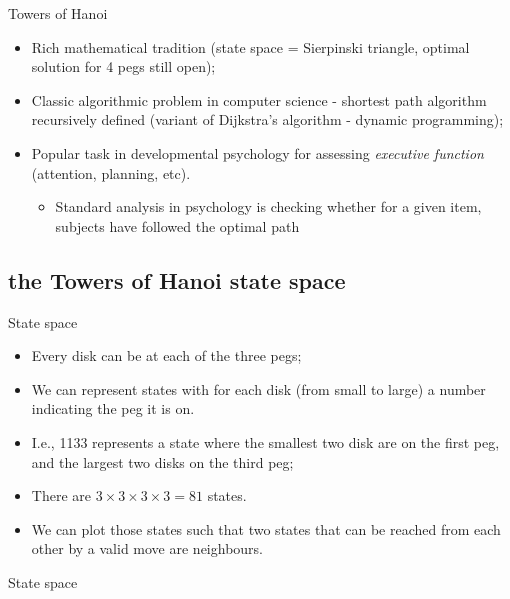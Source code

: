 \documentclass[xcolor=table]{beamer}
\begin{document}
\begin{frame}{Towers of Hanoi}
  \begin{itemize}
  \item Rich mathematical tradition (state space = \alert{Sierpinski triangle}, optimal solution for 4 pegs still open);
  \item Classic algorithmic problem in computer science - shortest path algorithm recursively defined (variant of \alert{Dijkstra's algorithm} - dynamic programming);
  \item Popular task in \alert{developmental psychology} for assessing \emph{executive function} (attention, planning, etc).
    \begin{itemize}
    \item Standard analysis in psychology is checking whether for a given item, subjects have followed the optimal path
    \end{itemize}
  \end{itemize}
\end{frame}

\subsection{the Towers of Hanoi state space}

\begin{frame}{State space}
  \begin{itemize}[<+->]
  \item Every disk can be at each of the three pegs;
  \item We can represent states with for each disk (from small to large) a number indicating the peg it is on.
  \item I.e., 1133 represents a state where the smallest two disk are on the first peg, and the largest two disks on the third peg;
  \item There are $3\times3\times3\times3=81$ states.
  \item We can plot those states such that two states that can be reached from each other by a valid move are neighbours.
  \end{itemize}
\end{frame}

\begin{frame}{State space}
\end{frame}
\end{document}
